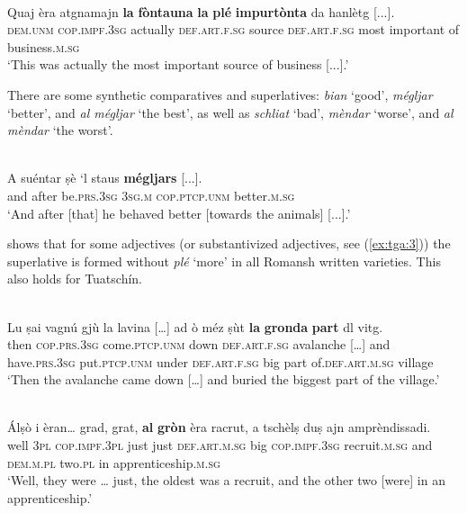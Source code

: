 \ea

\\
\gll Quaj èra atgnamajn \textbf{la} \textbf{fòntauna} \textbf{la} \textbf{plé} \textbf{impurtònta} da hanlètg [...].\\
\textsc{dem.unm} \textsc{cop.impf.3sg} actually  \textsc{def.art.f.sg} source \textsc{def.art.f.sg} most important of business.\textsc{m.sg}\\
\glt `This was actually the most important source of  business [...].'
\z

There are some synthetic comparatives and superlatives: \textit{bian} `good', \textit{mégljar} `better', and  \textit{al mégljar} `the best', as well as \textit{schliat} `bad', \textit{mèndar} `worse', and \textit{al mèndar} `the worst'.

\ea

\\
\gll A suéntar ṣè `l staus \textbf{mégljars} [...].\\
and after be\textsc{.prs.3sg} \textsc{3sg.m} \textsc{cop.ptcp.unm} better.\textsc{m.sg}\\
\glt`And after [that] he behaved better [towards the animals] [...].'
\z


\citet[233-50]{Linder1987} shows that for some adjectives (or substantivized adjectives, see (\ref{ex:tga:3})) the superlative is formed without \textit{plé} `more' in all Romansh written varieties. This also holds for Tuatschín.

\ea

\\
\gll    Lu ṣai vagnú gjù la lavina […] ad ò méz ṣùt \textbf{la} \textbf{gronda} \textbf{part} dl vitg.\\
then \textsc{cop.prs.3sg} come.\textsc{ptcp.unm} down \textsc{def.art.f.sg} avalanche […] and have.\textsc{prs.3sg} put.\textsc{ptcp.unm} under \textsc{def.art.f.sg} big part of.\textsc{def.art.m.sg} village\\
\glt `Then the avalanche came down […] and buried the biggest part of the village.'
\z

\ea\label{ex:tga:3}
\\
\gll   Álṣò i èran… grad, grat, \textbf{al} \textbf{gròn} èra racrut, a tschèlṣ duṣ ajn amprèndissadi. \\
well \textsc{3pl} \textsc{cop.impf.3pl} just just \textsc{def.art.m.sg} big \textsc{cop.impf.3sg} recruit.\textsc{m.sg} and  \textsc{dem.m.pl} two.\textsc{pl} in apprenticeship.\textsc{m.sg} \\
\glt `Well, they were … just, the oldest was a recruit, and the other two [were] in an apprenticeship.'\\
\z


